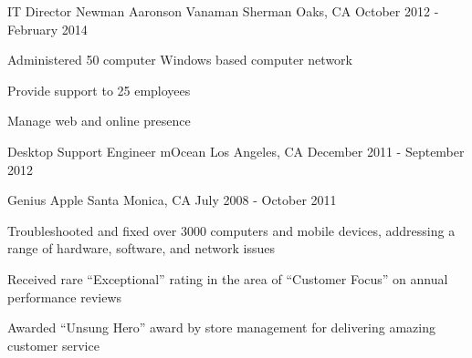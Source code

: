 \begin{cventries}
  \cventry
    {IT Director} %
    {Newman Aaronson Vanaman} %
    {Sherman Oaks, CA} %
    {October 2012 - February 2014} %
    {
      \begin{cvitems} %
        \item {Administered 50 computer Windows based computer network}
        \item {Provide support to 25 employees}
        \item {Manage web and online presence}
      \end{cvitems}
    }

  \cventry
    {Desktop Support Engineer} %
    {mOcean} %
    {Los Angeles, CA } %
    {December 2011 - September 2012} %
    {}

  \cventry
    {Genius} %
    {Apple} %
    {Santa Monica, CA} %
    {July 2008 - October 2011} %
    {
      \begin{cvitems} %
        \item {Troubleshooted and fixed over 3000 computers and mobile devices, addressing a range of hardware, software, and network issues}
        \item {Received rare ``Exceptional'' rating in the area of ``Customer Focus'' on annual performance reviews}
        \item {Awarded ``Unsung Hero'' award by store management for delivering amazing customer service}
      \end{cvitems}
    }

\end{cventries}
